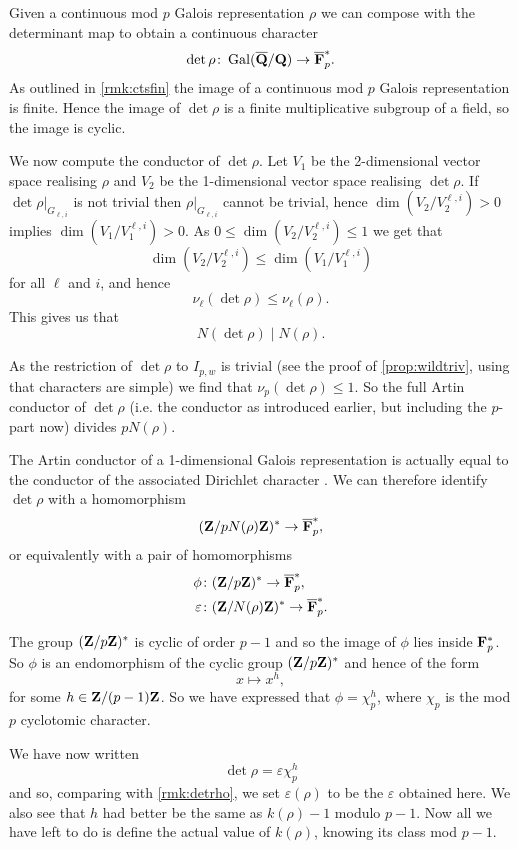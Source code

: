 \documentclass[a4paper,12pt]{article}
\begin{document}
Given a continuous mod $p$ Galois representation $\rho$ we can compose with the determinant map to obtain a continuous character
\[
\det \rho\colon \operatorname{Gal}(\overline{\mathbf{Q}}/\mathbf{Q}) \to \overline{\mathbf{F}}_p^*.
\]
As outlined in \cref{rmk:ctsfin} the image of a continuous mod $p$ Galois representation is finite.
Hence the image of $\det \rho$ is a finite multiplicative subgroup of a field, so the image is cyclic.

We now compute the conductor of $\det\rho$.
Let $V_1$ be the 2-dimensional vector space realising $\rho$ and $V_2$ be the 1-dimensional vector space realising $\det\rho$.
If $\det\rho|_{G_{\ell, i}}$ is not trivial then $\rho|_{G_{\ell,i}}$ cannot be trivial, hence $\dim(V_2/V_2^{\ell,i}) > 0$ implies $\dim(V_1/V_1^{\ell,i}) > 0$.
As $0 \le \dim(V_2/V_2^{\ell,i}) \le 1$ we get that
\[
\dim(V_2/V_2^{\ell,i})\le \dim(V_1/V_1^{\ell,i})
\]
for all $\ell$ and $i$, and hence
\[
\nu_\ell(\det\rho) \le \nu_\ell(\rho).
\]
This gives us that
\[
N(\det\rho) \mid N(\rho).
\]

As the restriction of $\det\rho$ to $I_{p,w}$ is trivial (see the proof of \cref{prop:wildtriv}, using that characters are simple) we find that $\nu_p(\det\rho)\le 1$.
So the full Artin conductor of $\det\rho$ (i.e. the conductor as introduced earlier, but including the $p$-part now) divides $pN(\rho)$.

The Artin conductor of a 1-dimensional Galois representation is actually equal to the conductor of the associated Dirichlet character \cite[p. 228]{SerreLF}.
We can therefore identify $\det\rho$ with a homomorphism
\[
(\mathbf{Z}/pN(\rho)\mathbf{Z})^* \to \overline{\mathbf{F}}_p^*,
\]
or equivalently with a pair of homomorphisms
\begin{align*}
\phi\colon& (\mathbf{Z}/p\mathbf{Z})^* \to \overline{\mathbf{F}}_p^*,\\
\varepsilon\colon& (\mathbf{Z}/N(\rho)\mathbf{Z})^* \to \overline{\mathbf{F}}_p^*.
\end{align*}

The group $(\mathbf{Z}/p\mathbf{Z})^*$ is cyclic of order $p-1$ and so the image of $\phi$ lies inside $\mathbf{F}_p^*$.
So $\phi$ is an endomorphism of the cyclic group $(\mathbf{Z}/p\mathbf{Z})^*$ and hence of the form
\[
x \mapsto x^h,
\]
for some $h \in \mathbf{Z}/(p-1)\mathbf{Z}$.
So we have expressed that $\phi = \chi_p^h$, where $\chi_p$ is the mod $p$ cyclotomic character.

We have now written
\[
\det\rho = \varepsilon \chi_p^h
\]
and so, comparing with \cref{rmk:detrho}, we set $\varepsilon(\rho)$ to be the $\varepsilon$ obtained here.
We also see that $h$ had better be the same as $k(\rho)-1$ modulo $p-1$.
Now all we have left to do is define the actual value of $k(\rho)$, knowing its class mod $p-1$.
\end{document}
